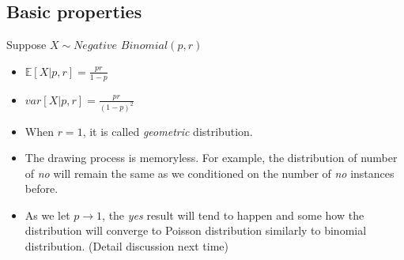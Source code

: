 \documentclass[11pt]{article}
\begin{document}
\subsection{Basic properties}
Suppose $X\sim\textit{Negative Binomial}(p,r)$
\begin{itemize}
	\item $\mathbb{E}[X|p,r] = \frac{pr}{1-p}$
	\item $var[X|p,r]=\frac{pr}{(1-p)^2}$
	\item When $r=1$, it is called {\it geometric} distribution.
	\item The drawing process is memoryless. For example, the distribution of number of {\it no} will remain the same as we conditioned on the number of {\it no} instances before.
	\item As we let $p\rightarrow1$, the {\it yes} result will tend to happen and some how the distribution will converge to Poisson distribution similarly to binomial distribution. (Detail discussion next time)
\end{itemize}
\end{document}

